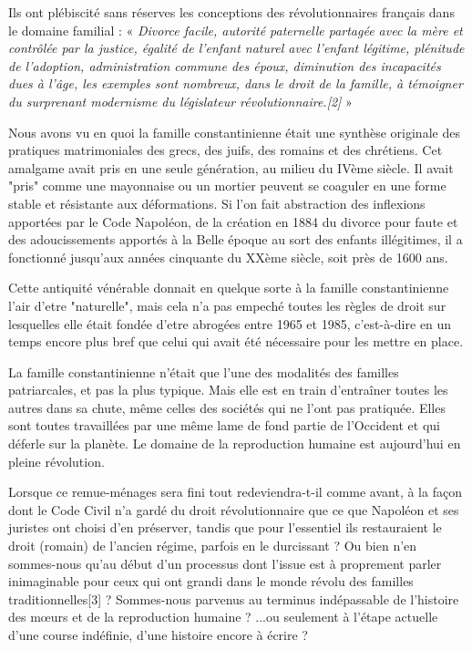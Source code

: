  Ils ont plébiscité sans réserves les conceptions des révolutionnaires français dans le domaine familial : « \emph{Divorce facile, autorité paternelle partagée avec la mère et contrôlée par la justice, égalité de l'enfant naturel avec l'enfant légitime, plénitude de l'adoption, administration commune des époux, diminution des incapacités dues à l'âge, les exemples sont nombreux, dans le droit de la famille, à témoigner du surprenant modernisme du législateur révolutionnaire.[2]} »
 
 
 Nous avons vu en quoi la famille constantinienne était une synthèse originale des pratiques matrimoniales des grecs, des juifs, des romains et des chrétiens. Cet amalgame avait pris en une seule génération, au milieu du IVème siècle. Il avait "pris" comme une mayonnaise ou un mortier peuvent se coaguler en une forme stable et résistante aux déformations.  Si l'on fait abstraction des inflexions apportées par le Code Napoléon, de la création en 1884 du divorce pour faute et des adoucissements apportés à la Belle époque au sort des enfants illégitimes, il a fonctionné jusqu'aux années cinquante du XXème siècle, soit près de 1600 ans. 
 
 Cette antiquité vénérable donnait en quelque sorte à la famille constantinienne l'air d'etre "naturelle", mais cela n'a pas empeché toutes les règles de droit sur lesquelles elle était fondée d'etre abrogées entre 1965 et 1985, c'est-à-dire en un temps encore plus bref que celui qui avait été nécessaire pour les mettre en place. 
 
 La famille constantinienne n'était que l'une des modalités des familles patriarcales, et pas la plus typique. Mais elle est en train d'entraîner toutes les autres dans sa chute, même celles des sociétés qui ne l'ont pas pratiquée. Elles sont toutes travaillées par une même lame de fond partie de l'Occident et qui déferle sur la planète. Le domaine de la reproduction humaine est aujourd'hui en pleine révolution.
  
 Lorsque ce remue-ménages sera fini tout redeviendra-t-il comme avant, à la façon dont le Code Civil n'a gardé du droit révolutionnaire que ce que Napoléon et ses juristes ont choisi d'en préserver, tandis que pour l'essentiel ils restauraient le droit (romain) de l'ancien régime, parfois en le durcissant ? 
 Ou bien n'en sommes-nous qu'au début d'un processus dont l'issue est à proprement parler inimaginable pour ceux qui ont grandi dans le monde révolu des familles traditionnelles[3] ? 
 Sommes-nous parvenus au terminus indépassable de l'histoire des mœurs et de la reproduction humaine ?
 ...ou seulement à l'étape actuelle d'une course indéfinie, d'une histoire encore à écrire ? 
 
